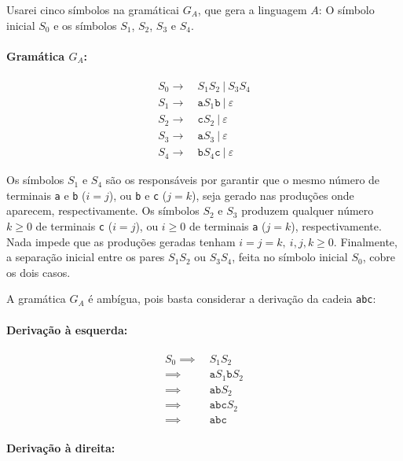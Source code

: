 \documentclass[a4paper, 12pt]{article}
\begin{document}
Usarei cinco símbolos na gramáticai $G_A$, que gera a linguagem $A$:
O símbolo inicial $S_0$ e os símbolos $S_1$, $S_2$, $S_3$ e $S_4$.

\paragraph{Gramática $G_A$:}

\begin{align*}
    S_0 \rightarrow & \: S_1S_2 \: | \: S_3S_4 \\
    S_1 \rightarrow & \: \texttt{a}S_1\texttt{b} \: | \: \varepsilon \\
    S_2 \rightarrow & \: \texttt{c}S_2 \: | \: \varepsilon \\
    S_3 \rightarrow & \: \texttt{a}S_3 \: | \: \varepsilon \\
    S_4 \rightarrow & \: \texttt{b}S_4\texttt{c} \: | \: \varepsilon
\end{align*}

Os símbolos $S_1$ e $S_4$ são os responsáveis por garantir
que o mesmo número de terminais \texttt{a} e \texttt{b} ($i=j$), ou
\texttt{b} e \texttt{c} ($j=k$), seja gerado nas produções onde aparecem,
respectivamente.
Os símbolos $S_2$ e $S_3$ produzem qualquer número $k \geq 0$ de terminais
\texttt{c} ($i=j$), ou $i \geq 0$ de terminais \texttt{a} ($j=k$),
respectivamente.
Nada impede que as produções geradas tenham $i=j=k, \: i,j,k \geq 0$.
Finalmente, a separação inicial entre os pares $S_1S_2$ ou $S_3S_4$,
feita no símbolo inicial $S_0$, cobre os dois casos.

A gramática $G_A$ é ambígua, pois basta considerar a derivação
da cadeia \texttt{abc}:

\paragraph{Derivação à esquerda:}

\begin{align*}
    S_0 \implies & \: S_1S_2 \\
    \implies & \: \texttt{a}S_1\texttt{b}S_2 \\
    \implies & \: \texttt{ab}S_2 \\
    \implies & \: \texttt{abc}S_2 \\
    \implies & \: \texttt{abc}
\end{align*}

\paragraph{Derivação à direita:}
\end{document}
